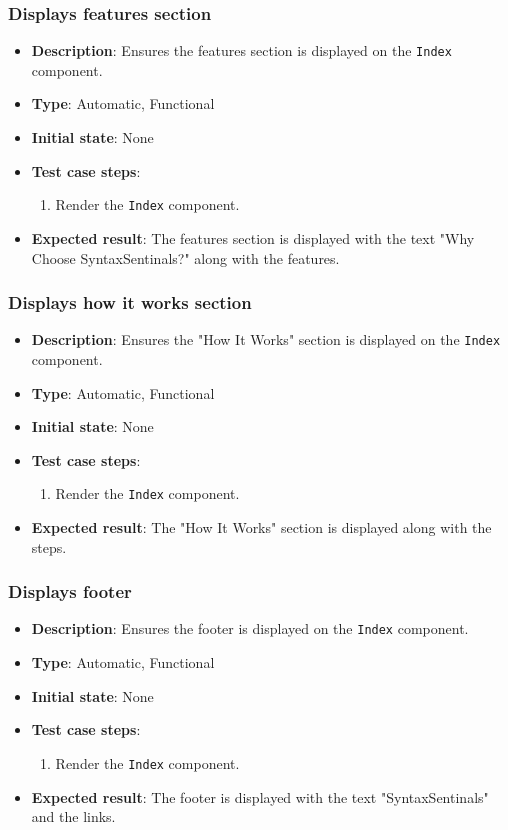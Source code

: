 \documentclass[12pt, titlepage]{article}
\begin{document}
\subsubsection{Displays features section}
\begin{itemize}
    \item \textbf{Description}: Ensures the features section is displayed on the \texttt{Index} component.
    \item \textbf{Type}: Automatic, Functional
    \item \textbf{Initial state}: None
    \item \textbf{Test case steps}:
    \begin{enumerate}
        \item Render the \texttt{Index} component.
    \end{enumerate}
    \item \textbf{Expected result}: The features section is displayed with the text "Why Choose SyntaxSentinals?" along with the features.
\end{itemize}

\subsubsection{Displays how it works section}
\begin{itemize}
    \item \textbf{Description}: Ensures the "How It Works" section is displayed on the \texttt{Index} component.
    \item \textbf{Type}: Automatic, Functional
    \item \textbf{Initial state}: None
    \item \textbf{Test case steps}:
    \begin{enumerate}
        \item Render the \texttt{Index} component.
    \end{enumerate}
    \item \textbf{Expected result}: The "How It Works" section is displayed along with the steps.
\end{itemize}

\subsubsection{Displays footer}
\begin{itemize}
    \item \textbf{Description}: Ensures the footer is displayed on the \texttt{Index} component.
    \item \textbf{Type}: Automatic, Functional
    \item \textbf{Initial state}: None
    \item \textbf{Test case steps}:
    \begin{enumerate}
        \item Render the \texttt{Index} component.
    \end{enumerate}
    \item \textbf{Expected result}: The footer is displayed with the text "SyntaxSentinals" and the links.

\end{itemize}
\end{document}
